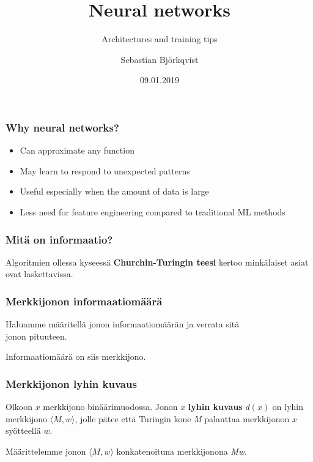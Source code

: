 \documentclass{beamer}
\title{Neural networks}
\subtitle{Architectures and training tips}
\author{Sebastian Bj{\"o}rkqvist}
\institute{IPRally Technologies}
\date[09.01.2019]{09.01.2019}
\newcommand{\kur}{\protect\textit}
\newcommand{\bol}{\protect\textbf}
\begin{document}
\frame{\titlepage}

  \begin{frame}
    \frametitle{Why neural networks?}  
    
   	\begin{itemize}
		\item Can approximate any function \cite{hornik}
		\item May learn to respond to unexpected patterns
		\item Useful especially when the amount of data is large
		\item Less need for feature engineering compared to traditional ML methods
	\end{itemize}
  \end{frame}

  \begin{frame}
    \frametitle{Mit{\"a} on informaatio?}   
    \Large Algoritmien ollessa kyseess{\"a} \bol{Churchin-Turingin teesi} kertoo mink{\"a}laiset asiat ovat laskettavissa. \\
    
    \vspace{8mm}
    
    
  \end{frame}
  
 
  \begin{frame}
    \frametitle{Merkkijonon informaatiom{\"a}{\"a}r{\"a}}   
	
	\Large Haluamme m{\"a}{\"a}ritell{\"a} jonon informaatiom{\"a}{\"a}r{\"a}n ja verrata sit{\"a} \\ jonon pituuteen.
    
	\vspace{8mm}
   
    Informaatiom{\"a}{\"a}r{\"a} on siis merkkijono.
  \end{frame}  
  
  \begin{frame}
    \frametitle{Merkkijonon lyhin kuvaus}   
    \Large Olkoon $x$ merkkijono bin{\"a}{\"a}rimuodossa. Jonon $x$ \bol{lyhin kuvaus} $d(x)$ on lyhin merkkijono $\langle M,w \rangle$, jolle p{\"a}tee ett{\"a} Turingin kone \kur{M}  palauttaa merkkijonon $x$ sy{\"o}tteell{\"a} $w$.  \\  
    \vspace{10px}
    
    M{\"a}{\"a}rittelemme jonon $\langle M,w \rangle$ konkatenoituna merkkijonona \kur{M}\kur{w}.
    
  \end{frame}  
 
\end{document}
